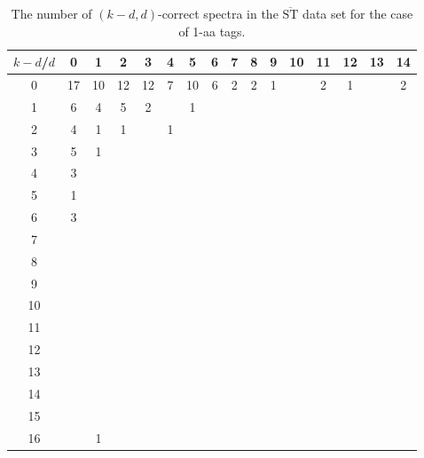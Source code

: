 \documentclass{article}[12pt]
\def\STbar{{\overline{\mathrm{ST}}}}
\begin{document}
\begin{landscape}

\begin{table}[h]\footnotesize
{\centering
\begin{tabular}{|c|c|
c|c|c|c|c|c|c|c|c|c|c|c|c|c|}
  \hline
  $k-d$/$d$ 
 & 0 & 1 & 2 & 3 & 4 & 5 & 6 & 7 & 8 & 9 & 10 & 11 & 12 & 13 & 14\\

  \hline
  \hline

0  & 17 & 10 & 12 & 12 & 7 & 10 & 6 & 2 & 2 & 1 &  & 2 & 1 &  & 2\\

1  & 6 & 4 & 5 & 2 &  & 1 &  &  &  &  &  &  &  &  & \\

2  & 4 & 1 & 1 &  & 1 &  &  &  &  &  &  &  &  &  & \\

3  & 5 & 1 &  &  &  &  &  &  &  &  &  &  &  &  & \\

4  & 3 &  &  &  &  &  &  &  &  &  &  &  &  &  & \\

5  & 1 &  &  &  &  &  &  &  &  &  &  &  &  &  & \\

6  & 3 &  &  &  &  &  &  &  &  &  &  &  &  &  & \\

7  &  &  &  &  &  &  &  &  &  &  &  &  &  &  & \\

8  &  &  &  &  &  &  &  &  &  &  &  &  &  &  & \\

9  &  &  &  &  &  &  &  &  &  &  &  &  &  &  & \\

10  &  &  &  &  &  &  &  &  &  &  &  &  &  &  & \\

11  &  &  &  &  &  &  &  &  &  &  &  &  &  &  & \\

12  &  &  &  &  &  &  &  &  &  &  &  &  &  &  & \\

13  &  &  &  &  &  &  &  &  &  &  &  &  &  &  & \\

14  &  &  &  &  &  &  &  &  &  &  &  &  &  &  & \\

15  &  &  &  &  &  &  &  &  &  &  &  &  &  &  & \\

16  &  & 1 &  &  &  &  &  &  &  &  &  &  &  &  & \\

  \hline
\end{tabular}
\par}
\centering
\caption{The number of $(k-d,d)$-correct spectra in the $\STbar$ data set for the case of 1-aa tags.}
\vspace{3mm}
\label{table:kd-1-correct-ST-bar}
\end{table}
\end{landscape}
\end{document}
